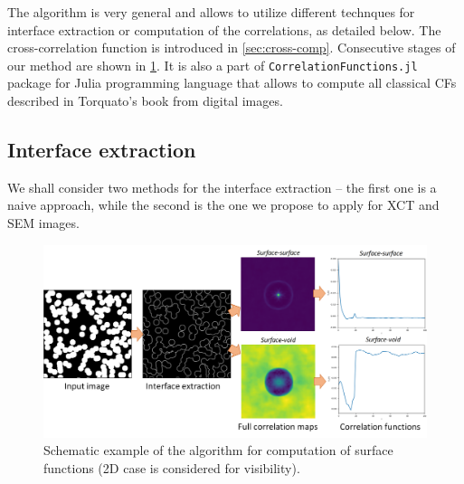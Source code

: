 \documentclass[reprint,amsmath,amssymb,aps,pre,showkeys,showpacs]{revtex4-1}
\newcommand{\code}[1]{\colorbox{light-gray}{\texttt{#1}}}
\begin{document}
The algorithm is very general and allows to utilize different technques for
interface extraction or computation of the correlations, as detailed below. The
cross-correlation function is introduced in \cref{sec:cross-comp}. Consecutive
stages of our method are shown in \cref{fig:stages}. It is also a part of
\code{CorrelationFunctions.jl} package \cite{CFsjlpaper} for Julia programming
language that allows to compute all classical CFs described in Torquato’s book
\cite{Torquato_book} from digital images.

\subsection{Interface extraction}
We shall consider two methods for the interface extraction -- the first one is a
naive approach, while the second is the one we propose to apply for XCT and SEM
images.

\begin{figure}[!pt]
  \centering
  \includegraphics[width=0.6\linewidth]{images/algo.png}
  \caption[]{Schematic example of the algorithm for computation of surface
    functions (2D case is considered for visibility).}
  \label{fig:stages}
\end{figure}
\end{document}
